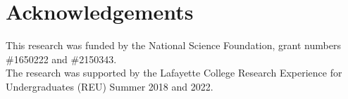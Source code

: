 \documentclass[submit]{smj}
\begin{document}
\section*{Acknowledgements}
This research was funded by the National Science Foundation, grant numbers \#1650222 and \#2150343.  \\
The research was supported by the Lafayette College Research Experience for Undergraduates (REU) Summer 2018 and 2022. 




\end{document}
